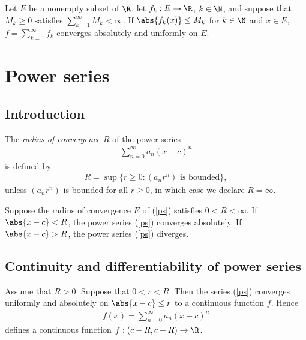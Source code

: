 \documentclass{article}
\begin{document}
\begin{theorem}
	Let $E$ be a nonempty subset of $\R$, let $f_k:E\to\R$, $k\in\N$, and suppose that $M_k\geq 0$
	satisfies $\sum_{k=1}^\infty M_k<\infty$. If $\abs{f_k(x)}\leq M_k$ for $k\in\N$ and $x\in E$,
	$f=\sum_{k=1}^\infty f_k$ converges absolutely and uniformly on $E$.
\end{theorem}

\section{Power series}

\subsection{Introduction}

\begin{definition}
	The \emph{radius of convergence $R$} of the power series
	\begin{align}
		\label{ps}
		\sum_{n=0}^\infty a_n(x-c)^n
	\end{align}
	is defined by
	\begin{align*}
		R = \sup\{r\geq 0:(a_nr^n) \text{ is bounded}\},
	\end{align*}
	unless $(a_nr^n)$ is bounded for all $r\geq 0$, in which case we declare $R=\infty$.
\end{definition}

\begin{theorem}[Notes 3.1]
	Suppose the radius of convergence $E$ of (\ref{ps}) satisfies $0<R<\infty$.
	If $\abs{x-c}<R$, the power series (\ref{ps}) converges absolutely. If
	$\abs{x-c}>R$, the power series (\ref{ps}) diverges.
\end{theorem}

\subsection{Continuity and differentiability of power series}

\begin{theorem}[Notes 3.2]
	Assume that $R>0$. Suppose that $0<r<R$. Then the series (\ref{ps}) converges
	uniformly and absolutely on $\abs{x-c}\leq r$ to a continuous function $f$.
	Hence
	\begin{align*}
		f(x) = \sum_{n=0}^\infty a_n(x-c)^n
	\end{align*}
	defines a continuous function $f:(c-R, c+R)\to\R$.
\end{theorem}
\end{document}
